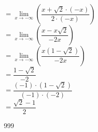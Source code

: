 \documentclass[a4paper]{article}
\begin{document}
$= \lim\limits_{x \rightarrow -\infty} \left(\dfrac{x + \sqrt{2} \cdot (-x)}{2 \cdot (-x)}\right)$ \\

$= \lim\limits_{x \rightarrow -\infty} \left(\dfrac{x - x\sqrt{2}}{-2x}\right)$ \\

$= \lim\limits_{x \rightarrow -\infty} \left(\dfrac{x(1 - \sqrt{2})}{-2x}\right)$ \\

$= \dfrac{1 - \sqrt{2}}{-2}$ \\

$= \dfrac{(-1) \cdot (1 - \sqrt{2})}{(-1) \cdot (-2)}$ \\

$= \dfrac{\sqrt{2} - 1}{2}$ \\

\begin{thebibliography}{999}
\end{thebibliography}
\end{document}
